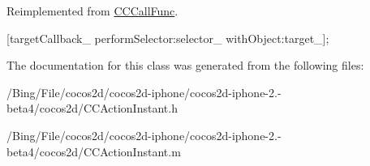 Reimplemented from \hyperlink{interface_c_c_call_func_ab2a87767fa9a0cd2dbf1a49bb4f04d94}{C\-C\-Call\-Func}.


\begin{DoxyCode}
{
        [targetCallback_ performSelector:selector_ withObject:target_];
}
\end{DoxyCode}


The documentation for this class was generated from the following files\-:\begin{DoxyCompactItemize}
\item 
/\-Bing/\-File/cocos2d/cocos2d-\/iphone/cocos2d-\/iphone-\/2.-\/beta4/cocos2d/C\-C\-Action\-Instant.\-h\item 
/\-Bing/\-File/cocos2d/cocos2d-\/iphone/cocos2d-\/iphone-\/2.-\/beta4/cocos2d/C\-C\-Action\-Instant.\-m\end{DoxyCompactItemize}
